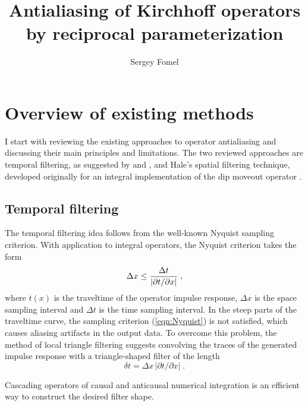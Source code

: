 
\title{Antialiasing of Kirchhoff operators by reciprocal
  parameterization}

\author{Sergey Fomel}
\maketitle



\section{Overview of existing methods}

I start with reviewing the existing approaches to operator
antialiasing and discussing their main principles and limitations. The
two reviewed approaches are temporal filtering, as suggested by
\cite{GPR40-05-05650572} and \cite{SEG-1994-1282}, and Hale's spatial
filtering technique, developed originally for an integral
implementation of the dip moveout operator \cite[]{GEO56-06-07950805}.

\subsection{Temporal filtering}
The temporal filtering idea follows
from the well-known Nyquist sampling criterion. With application to
integral operators, the Nyquist criterion takes the form
\begin{equation}
\Delta x \leq {{\Delta t} \over {|\partial t / \partial x|}}\;,
\label{eqn:Nyquist}
\end{equation}
where $t(x)$ is the traveltime of the operator impulse response,
$\Delta x$ is the space sampling interval and $\Delta t$ is the time
sampling interval. In the steep parts of the traveltime curve, the
sampling criterion (\ref{eqn:Nyquist}) is not satisfied, which causes
aliasing artifacts in the output data. To overcome this problem, the
method of local triangle filtering
\cite[]{Claerbout.sep.73.371,SEG-1994-1282} suggests convolving the
traces of the generated impulse response with a triangle-shaped filter
of the length
\begin{equation}
\delta t = \Delta x\,|\partial t / \partial x|\;.
\label{eqn:dt}
\end{equation}


Cascading operators of causal and anticausal numerical integration is
an efficient way to construct the desired filter shape.

